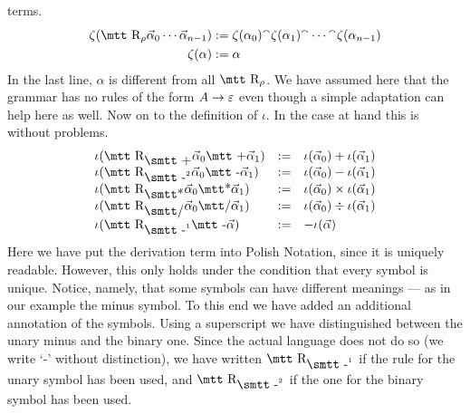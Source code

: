 terms.
\begin{equation}
\begin{split}
\zeta(\mbox{\mtt R}_{\rho}\vec{\alpha}_0 \dotsb
    \vec{\alpha}_{n-1}) & := \zeta(\alpha_0) \conc
        \zeta(\alpha_1) \conc \dotsb \conc
        \zeta(\alpha_{n-1}) \\
\zeta(\alpha) & := \alpha
\end{split}
\end{equation}
In the last line, $\alpha$ is different from all $\mbox{\mtt R}_{\rho}$.
We have assumed here that the grammar has no rules of the form
$A \rightarrow \varepsilon$ even though a simple adaptation can
help here as well. Now on to the definition of $\iota$.
In the case at hand this is without problems.
\begin{equation}
\begin{array}{l@{\quad := \quad}l}
\iota(\mbox{\mtt R}_{\mbox{\smtt +}}\vec{\alpha}_0\mbox{\mtt +}\vec{\alpha}_1) 
	& \iota(\vec{\alpha}_0) + \iota(\vec{\alpha}_1) \\
\iota(\mbox{\mtt R}_{\mbox{\smtt -}^2}\vec{\alpha}_0\mbox{\mtt -}%
\vec{\alpha}_1) &
    \iota(\vec{\alpha}_0) - \iota(\vec{\alpha}_1) \\
\iota(\mbox{\mtt R}_{\mbox{\smtt\symbol{42}}}\vec{\alpha}_0%
\mbox{\mtt\symbol{42}}\vec{\alpha}_1) &
    \iota(\vec{\alpha}_0) \times \iota(\vec{\alpha}_1) \\
\iota(\mbox{\mtt R}_{\mbox{\smtt\symbol{47}}}\vec{\alpha}_0%
\mbox{\mtt\symbol{47}}\vec{\alpha}_1) &
    \iota(\vec{\alpha}_0) \div \iota(\vec{\alpha}_1) \\
\iota(\mbox{\mtt R}_{\mbox{\smtt -}^1}\mbox{\mtt -}\vec{\alpha}) 
	& - \iota(\vec{\alpha})
\end{array}
\end{equation}
Here we have put the derivation term into Polish Notation, 
since it is uniquely readable. However, this only holds under
the condition that every symbol is unique. Notice, namely, that
some symbols can have different meanings --- as in our example the
minus symbol. To this end we have added an additional annotation
of the symbols. Using a superscript we have distinguished between
the unary minus and the binary one. Since the actual language does
not do so (we write `{\mtt -}' without distinction), we have written
$\mbox{\mtt R}_{\mbox{\smtt -}^1}$ if the rule for the unary symbol 
has been used, and $\mbox{\mtt R}_{\mbox{\smtt -}^2}$ if the one for 
the binary symbol has been used.

